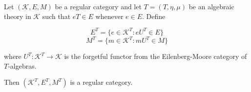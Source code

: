 Let $(\mathcal{K}, E, M)$ be a regular category and let $T = (T, \eta, \mu)$ be an algebraic theory in $\mathcal{K}$ such that $eT \in E$ whenever $e \in E$. Define

$$E^T = \{e \in \mathcal{K}^T : eU^T \in E\}$$
$$M^T = \{m \in \mathcal{K}^T : mU^T \in M\}$$

where $U^T: \mathcal{K}^T \longrightarrow \mathcal{K}$ is the forgetful functor from the Eilenberg-Moore category of $T$-algebras.

Then $(\mathcal{K}^T, E^T, M^T)$ is a regular category.
